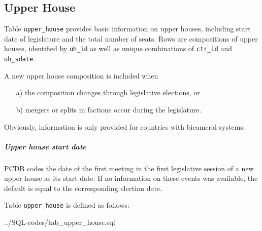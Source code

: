 \subsection{Upper House}\label{subsec_tab_upper_house}
Table \texttt{\footnotesize upper\_house} provides basic information on upper houses, including start date of legislature and the total number of seats. 
Rows are compositions of upper houses, identified by \texttt{\footnotesize uh\_id} as well as unique combinations of \texttt{\footnotesize ctr\_id} and \texttt{\footnotesize uh\_sdate}.
 
A new upper house composition is included when
\begin{itemize}\itemsep-4pt 
\item[a)]the composition changes through legislative elections, or
\item[b)]mergers or splits in factions occur during the legislature.
\end{itemize} 
Obviously, information is only provided for countries with bicameral systems.

\subparagraph{Upper house start date}
PCDB codes the date of the first meeting in the first legislative session of a new upper house as its start date. If no information on these events was available, the default is equal to the corresponding election date. 

Table \texttt{\footnotesize upper\_house} is defined as follows:

%
{../SQL-codes/tab_upper_house.sql}

